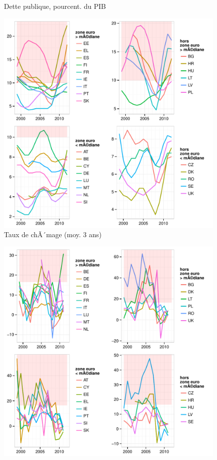 \documentclass{article}\usepackage[]{graphicx}\usepackage[]{color}
\makeatletter
\def\maxwidth{ %
  \ifdim\Gin@nat@width>\linewidth
    \linewidth
  \else
    \Gin@nat@width
  \fi
}
\newenvironment{knitrout}{}{} %
\makeatother
\begin{document}
\begin{knitrout}
\begin{figure}[p]
{}

\caption[Dette publique, pourcent]{Dette publique, pourcent. du PIB\label{fig:byind9}}
\end{figure}

\begin{figure}[p]


{\centering \includegraphics[width=\maxwidth]{figure_graph/byind10} 

}

\caption[Taux de chÃ´mage (moy]{Taux de chÃ´mage (moy. 3 ans)\label{fig:byind10}}
\end{figure}

\begin{figure}[p]


{\centering \includegraphics[width=\maxwidth]{figure_graph/byind11} 

}
\end{figure}
\end{knitrout}
\end{document}
